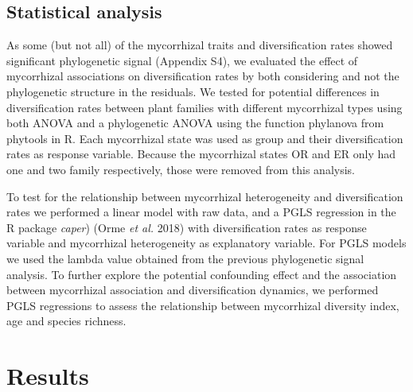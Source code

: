 \documentclass[12pt,]{article}
\begin{document}
\hypertarget{statistical-analysis}{%
\subsection{Statistical analysis}\label{statistical-analysis}}

As some (but not all) of the mycorrhizal traits and diversification
rates showed significant phylogenetic signal (Appendix S4), we evaluated
the effect of mycorrhizal associations on diversification rates by both
considering and not the phylogenetic structure in the residuals. We
tested for potential differences in diversification rates between plant
families with different mycorrhizal types using both ANOVA and a
phylogenetic ANOVA using the function phylanova from phytools in R. Each
mycorrhizal state was used as group and their diversification rates as
response variable. Because the mycorrhizal states OR and ER only had one
and two family respectively, those were removed from this analysis.

To test for the relationship between mycorrhizal heterogeneity and
diversification rates we performed a linear model with raw data, and a
PGLS regression in the R package \emph{caper}) (Orme \emph{et al.} 2018)
with diversification rates as response variable and mycorrhizal
heterogeneity as explanatory variable. For PGLS models we used the
lambda value obtained from the previous phylogenetic signal analysis. To
further explore the potential confounding effect and the association
between mycorrhizal association and diversification dynamics, we
performed PGLS regressions to assess the relationship between
mycorrhizal diversity index, age and species richness.

\hypertarget{results}{%
\section{Results}\label{results}}
\end{document}
